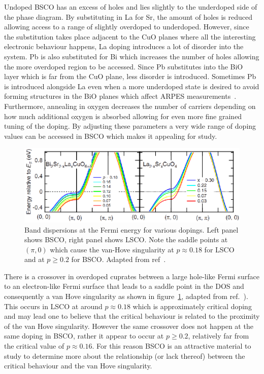 Undoped \ac{BSCO} has an excess of holes and lies slightly to the underdoped side of the phase diagram. By substituting in La for Sr, the amount of holes is reduced allowing access to a range of slightly overdoped to underdoped. However, since the substitution takes place adjacent to the CuO planes where all the interesting electronic behaviour happens, La doping introduces a lot of disorder into the system. Pb is also substituted for Bi which increases the number of holes allowing the more overdoped region to be accessed. Since Pb substitutes into the BiO layer which is far from the CuO plane, less disorder is introduced. Sometimes Pb is introduced alongside La even when a more underdoped state is desired to avoid forming structures in the BiO planes which affect \ac{ARPES} measurements~\cite{Kondo2007}. Furthermore, annealing in oxygen decreases the number of carriers depending on how much additional oxygen is absorbed allowing for even more fine grained tuning of the doping. By adjusting these parameters a very wide range of doping values can be accessed in \ac{BSCO} which makes it appealing for study.

\begin{figure}[htbp]
    \begin{center}
        \includegraphics[scale=1.0]{Chapter-Introduction/Figures/VanHoveBSCOLSCO/VanHoveBSCOLSCO}
        \caption{Band dispersions at the Fermi energy for various dopings. Left panel shows \ac{BSCO}, right panel shows \ac{LSCO}. Note the saddle points at $(\pi, 0)$ which cause the van-Hove singularity at $p\approx 0.18$ for \ac{LSCO} and at $p \geq 0.2$ for \ac{BSCO}. Adapted from ref~\cite{Hashimoto2008}.}
        \label{Fig:Intro:VanHoveBSCOLSCO}
    \end{center}
\end{figure}

There is a crossover in overdoped cuprates between a large hole-like Fermi surface to an electron-like Fermi surface that leads to a saddle point in the \ac{DOS} and consequently a van Hove singularity as shown in figure~\ref{Fig:Intro:VanHoveBSCOLSCO}, adapted from ref.~\cite{Hashimoto2008}). This occurs in \ac{LSCO} at around $p\approx0.18$ which is approximately critical doping and may lead one to believe that the critical behaviour is related to the proximity of the van Hove singularity. However the same crossover does not happen at the same doping in \ac{BSCO}, rather it appear to occur at $p \geq 0.2$, relatively far from the critical value of $p \approx 0.16$. For this reason \ac{BSCO} is an attractive material to study to determine more about the relationship (or lack thereof) between the critical behaviour and the van Hove singularity.

